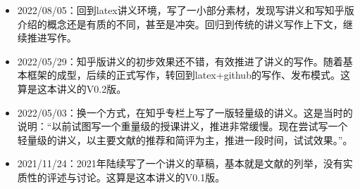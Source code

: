 \documentclass[UTF8]{ctexrep}
\begin{document}
\renewcommand{\labelitemi}{\Writinghand}
%
\begin{itemize}
    \item 2022/08/05：回到latex讲义环境，写了一小部分素材，发现写讲义和写知乎版介绍的概念还是有质的不同，甚至是冲突。回归到传统的讲义写作上下文，继续推进写作。

    \item 2022/05/29：知乎版讲义的初步效果还不错，有效推进了讲义的写作。随着基本框架的成型，后续的正式写作，转回到latex+github的写作、发布模式。这算是这本讲义的V0.2版。
    
    \item 2022/05/03：换一个方式，在知乎专栏上写了一版轻量级的讲义。这是当时的说明：“以前试图写一个重量级的授课讲义，推进非常缓慢。现在尝试写一个轻量级的讲义，以主要文献的推荐和简评为主，推进一段时间，试试效果。”。
    
    \item 2021/11/24：2021年陆续写了一个讲义的草稿，基本就是文献的列举，没有实质性的评述与讨论。这算是这本讲义的V0.1版。
\end{itemize}


%
%




\end{document}
